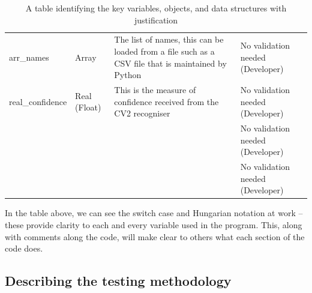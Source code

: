 \documentclass[9pt]{article}
\begin{document}
\begin{table}[H]
\begin{tabularx}{\textwidth}{llXX}
		arr\_names             & Array              & The list of names, this can be loaded from a file such as a CSV file that is maintained by Python                                                 & No validation needed (Developer)                                                                                                        \\
		real\_confidence       & Real (Float)               & This is the measure of confidence received from the CV2 recogniser                                                                                & No validation needed (Developer)                                                                                                        \\
		&                    &                                                                                                                                                   & No validation needed (Developer)                                                                                                        \\[0.5cm] 
		&                    &                                                                                                                                                   & No validation needed (Developer)                                                                                                        \\ \hline
	\end{tabularx}
	\caption{A table identifying the key variables, objects, and data structures with justification}
	\label{tab_keyItems}
\end{table}
In the table above, we can see the switch case and Hungarian notation at work -- these provide clarity to each and every variable used in the program. This, along with comments along the code, will make clear to others what each section of the code does.









\newpage
\subsection{Describing the testing methodology}
\end{document}
